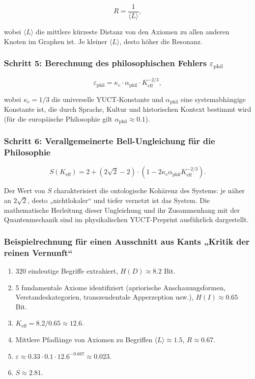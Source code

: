\documentclass[12pt,a4paper]{article}
\newcommand{\kappac}{\kappa_c}
\newcommand{\eps}{\varepsilon}
\begin{document}
	\[
	R = \frac{1}{\langle L \rangle},
	\]
	
	wobei \(\langle L \rangle\) die mittlere kürzeste Distanz von den Axiomen zu allen anderen Knoten im Graphen ist. Je kleiner \(\langle L \rangle\), desto höher die Resonanz.
	
	\subsubsection{Schritt 5: Berechnung des philosophischen Fehlers \(\eps_{\text{phil}}\)}
	
	\[
	\eps_{\text{phil}} = \kappac \cdot \alpha_{\text{phil}} \cdot K_{\mathrm{eff}}^{-2/3},
	\]
	
	wobei \(\kappac = 1/3\) die universelle YUCT-Konstante und \(\alpha_{\text{phil}}\) eine systemabhängige Konstante ist, die durch Sprache, Kultur und historischen Kontext bestimmt wird (für die europäische Philosophie gilt \(\alpha_{\text{phil}} \approx 0.1\)).
	
	\subsubsection{Schritt 6: Verallgemeinerte Bell-Ungleichung für die Philosophie}
	
	\[
	S(K_{\mathrm{eff}}) = 2 + (2\sqrt{2} - 2) \cdot \left(1 - 2\kappac \alpha_{\text{phil}} K_{\mathrm{eff}}^{-2/3}\right).
	\]
	
	Der Wert von \(S\) charakterisiert die ontologische Kohärenz des Systems: je näher an \(2\sqrt{2}\), desto „nichtlokaler“ und tiefer vernetzt ist das System. Die mathematische Herleitung dieser Ungleichung und ihr Zusammenhang mit der Quantenmechanik sind im physikalischen YUCT-Preprint \cite{Yakushev2026b} ausführlich dargestellt.
	
	\subsubsection{Beispielrechnung für einen Ausschnitt aus Kants „Kritik der reinen Vernunft“}
	
	\begin{enumerate}
		\item 320 eindeutige Begriffe extrahiert, \(H(D) \approx 8.2\) Bit.
		\item 5 fundamentale Axiome identifiziert (apriorische Anschauungsformen, Verstandeskategorien, transzendentale Apperzeption usw.), \(H(I) \approx 0.65\) Bit.
		\item \(K_{\mathrm{eff}} = 8.2 / 0.65 \approx 12.6\).
		\item Mittlere Pfadlänge von Axiomen zu Begriffen \(\langle L \rangle \approx 1.5\), \(R \approx 0.67\).
		\item \(\eps \approx 0.33 \cdot 0.1 \cdot 12.6^{-0.667} \approx 0.023\).
		\item \(S \approx 2.81\).
	\end{enumerate}
	
\end{document}
